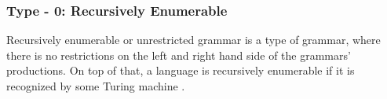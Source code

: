 \subsubsection{Type - 0: Recursively Enumerable}
Recursively enumerable or unrestricted grammar is a type of grammar, where there is no restrictions on the left and right hand side of the grammars' productions. On top of that, a language is recursively enumerable if it is recognized by some Turing machine \citep{sipser}.  %

